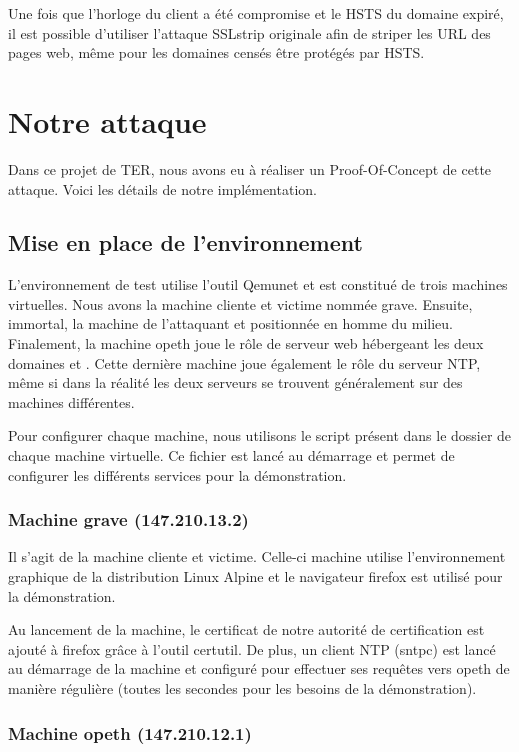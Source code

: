 Une fois que l'horloge du client a été compromise et le HSTS du domaine expiré, il est possible d'utiliser l'attaque SSLstrip originale afin de striper les URL des pages web, même pour les domaines censés être protégés par HSTS.

\section{Notre attaque}

Dans ce projet de TER, nous avons eu à réaliser un Proof-Of-Concept de cette attaque. Voici les détails de notre implémentation.

\subsection{Mise en place de l'environnement}

L'environnement de test utilise l'outil Qemunet et est constitué de trois machines virtuelles. Nous avons la machine cliente et victime nommée grave. Ensuite, immortal, la machine de l'attaquant et positionnée en homme du milieu. Finalement, la machine opeth joue le rôle de serveur web hébergeant les deux domaines  et . Cette dernière machine joue également le rôle du serveur NTP, même si dans la réalité les deux serveurs se trouvent généralement sur des machines différentes.

Pour configurer chaque machine, nous utilisons le script  présent dans le dossier de chaque machine virtuelle. Ce fichier est lancé au démarrage et permet de configurer les différents services pour la démonstration.

\subsubsection{Machine grave (147.210.13.2)}

Il s'agit de la machine cliente et victime. Celle-ci machine utilise l'environnement graphique de la distribution Linux Alpine et le navigateur firefox est utilisé pour la démonstration.

Au lancement de la machine, le certificat de notre autorité de certification est ajouté à firefox grâce à l'outil certutil. De plus, un client NTP (sntpc) est lancé au démarrage de la machine et configuré pour effectuer ses requêtes vers opeth de manière régulière (toutes les secondes pour les besoins de la démonstration).

\subsubsection{Machine opeth (147.210.12.1)}


